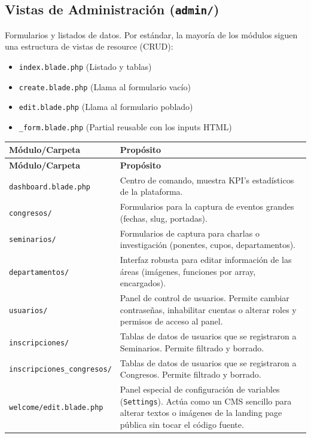 \documentclass{article}
\begin{document}
\subsection{Vistas de Administración (\texttt{admin/})}

Formularios y listados de datos. Por estándar, la mayoría de los módulos siguen una estructura de vistas de resource (CRUD):
\begin{itemize}
    \item \texttt{index.blade.php} (Listado y tablas)
    \item \texttt{create.blade.php} (Llama al formulario vacío)
    \item \texttt{edit.blade.php} (Llama al formulario poblado)
    \item \texttt{\_form.blade.php} (Partial reusable con los inputs HTML)
\end{itemize}

\begin{longtable}{>{\raggedright\arraybackslash}p{5cm} >{\raggedright\arraybackslash}p{10cm}}
\toprule
\textbf{Módulo/Carpeta} & \textbf{Propósito} \\
\midrule
\endfirsthead
\toprule
\textbf{Módulo/Carpeta} & \textbf{Propósito} \\
\midrule
\endhead
\bottomrule
\endfoot
\bottomrule
\endlastfoot
\texttt{dashboard.blade.php} & Centro de comando, muestra KPI's estadísticos de la plataforma. \\
\texttt{congresos/} & Formularios para la captura de eventos grandes (fechas, slug, portadas). \\
\texttt{seminarios/} & Formularios de captura para charlas o investigación (ponentes, cupos, departamentos). \\
\texttt{departamentos/} & Interfaz robusta para editar información de las áreas (imágenes, funciones por array, encargados). \\
\texttt{usuarios/} & Panel de control de usuarios. Permite cambiar contraseñas, inhabilitar cuentas o alterar roles y permisos de acceso al panel. \\
\texttt{inscripciones/} & Tablas de datos de usuarios que se registraron a Seminarios. Permite filtrado y borrado. \\
\texttt{inscripciones\_congresos/} & Tablas de datos de usuarios que se registraron a Congresos. Permite filtrado y borrado. \\
\texttt{welcome/edit.blade.php} & Panel especial de configuración de variables (\texttt{Settings}). Actúa como un CMS sencillo para alterar textos o imágenes de la landing page pública sin tocar el código fuente. \\
\end{longtable}
\end{document}
